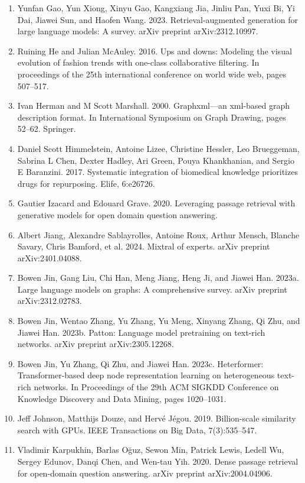 \documentclass[11pt,UTF8,fontset=fandol]{ctexart}
\begin{document}
\begin{enumerate}[leftmargin=2em]
\item Yunfan Gao, Yun Xiong, Xinyu Gao, Kangxiang Jia, Jinliu Pan, Yuxi Bi, Yi Dai, Jiawei Sun, and Haofen Wang. 2023. Retrieval-augmented generation for large language models: A survey. arXiv preprint arXiv:2312.10997.
\item Ruining He and Julian McAuley. 2016. Ups and downs: Modeling the visual evolution of fashion trends with one-class collaborative filtering. In proceedings of the 25th international conference on world wide web, pages 507--517.
\item Ivan Herman and M Scott Marshall. 2000. Graphxml---an xml-based graph description format. In International Symposium on Graph Drawing, pages 52--62. Springer.
\item Daniel Scott Himmelstein, Antoine Lizee, Christine Hessler, Leo Brueggeman, Sabrina L Chen, Dexter Hadley, Ari Green, Pouya Khankhanian, and Sergio E Baranzini. 2017. Systematic integration of biomedical knowledge prioritizes drugs for repurposing. Elife, 6:e26726.
\item Gautier Izacard and Edouard Grave. 2020. Leveraging passage retrieval with generative models for open domain question answering.
\item Albert Jiang, Alexandre Sablayrolles, Antoine Roux, Arthur Mensch, Blanche Savary, Chris Bamford, et al. 2024. Mixtral of experts. arXiv preprint arXiv:2401.04088.
\item Bowen Jin, Gang Liu, Chi Han, Meng Jiang, Heng Ji, and Jiawei Han. 2023a. Large language models on graphs: A comprehensive survey. arXiv preprint arXiv:2312.02783.
\item Bowen Jin, Wentao Zhang, Yu Zhang, Yu Meng, Xinyang Zhang, Qi Zhu, and Jiawei Han. 2023b. Patton: Language model pretraining on text-rich networks. arXiv preprint arXiv:2305.12268.
\item Bowen Jin, Yu Zhang, Qi Zhu, and Jiawei Han. 2023c. Heterformer: Transformer-based deep node representation learning on heterogeneous text-rich networks. In Proceedings of the 29th ACM SIGKDD Conference on Knowledge Discovery and Data Mining, pages 1020--1031.
\item Jeff Johnson, Matthijs Douze, and Herv\'e J\'egou. 2019. Billion-scale similarity search with GPUs. IEEE Transactions on Big Data, 7(3):535--547.
\item Vladimir Karpukhin, Barlas O\u{g}uz, Sewon Min, Patrick Lewis, Ledell Wu, Sergey Edunov, Danqi Chen, and Wen-tau Yih. 2020. Dense passage retrieval for open-domain question answering. arXiv preprint arXiv:2004.04906.

\end{enumerate}
\end{document}
